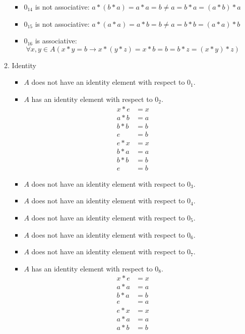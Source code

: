 \begin{enumerate}[label={\Alph*.},font={\bfseries}]
\begin{enumerate}[label={\arabic*},font={\bfseries}]
\begin{itemize}
          \item $0_{14}$ is not associative: $a*(b*a)=a*a=b \neq a=b*a=(a*b)*a$
          \item $0_{15}$ is not associative: $a*(a*a)=a*b=b \neq a=b*b=(a*a)*b$
          \item $0_{16}$ is associative:
            $$\forall x,y \in A (x*y=b \to x*(y*z)=x*b=b=b*z=(x*y)*z)$$
        \end{itemize}
      \item Identity
        \begin{itemize}
          \item $A$ does not have an identity element with respect to $0_1$.
          \item $A$ has an identity element with respect to $0_2$.
            \begin{align*}
              x*e &= x \\
              a*b &= a \\
              b*b &= b \\
              e &= b \\
              e*x &= x \\
              b*a &= a \\
              b*b &= b \\
              e &= b
            \end{align*}
          \item $A$ does not have an identity element with respect to $0_3$.
          \item $A$ does not have an identity element with respect to $0_4$.
          \item $A$ does not have an identity element with respect to $0_5$.
          \item $A$ does not have an identity element with respect to $0_6$.
          \item $A$ does not have an identity element with respect to $0_7$.
          \item $A$ has an identity element with respect to $0_8$.
            \begin{align*}
              x*e &= x \\
              a*a &= a \\
              b*a &= b \\
              e &= a \\
              e*x &= x \\
              a*a &= a \\
              a*b &= b \\

\end{align*}
\end{itemize}
\end{enumerate}
\end{enumerate}
